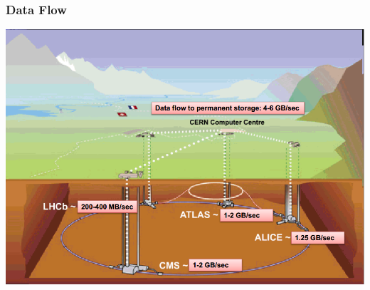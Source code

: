 \documentclass{beamer}
\begin{document}

\begin{frame}
    \frametitle{Data Flow}
    \includegraphics[width=1.0\textwidth,trim=4 4 4 4,clip]{LHC_DataFlow.png}
\end{frame}

\end{document}
